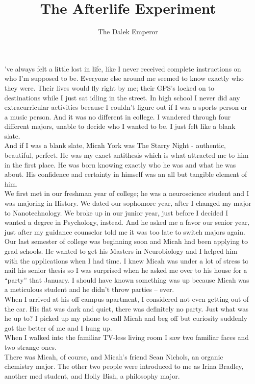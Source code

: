 \documentclass[a5paper]{scrartcl}
\title{The Afterlife Experiment}
\author{The Dalek Emperor}
\begin{document}
\maketitle

've always felt a little lost in life, like I never received complete instructions on who I'm supposed to be. Everyone else around me seemed to know exactly who they were. Their lives would fly right by me; their GPS’s locked on to destinations while I just sat idling in the street. In high school I never did any extracurricular activities because I couldn't figure out if I was a sports person or a music person. And it was no different in college. I wandered through four different majors, unable to decide who I wanted to be. I just felt like a blank slate.\\
And if I was a blank slate, Micah York was The Starry Night - authentic, beautiful, perfect. He was my exact antithesis which is what attracted me to him in the first place. He was born knowing exactly who he was and what he was about. His confidence and certainty in himself was an all but tangible element of him.\\
We first met in our freshman year of college; he was a neuroscience student and I was majoring in History. We dated our sophomore year, after I changed my major to Nanotechnology. We broke up in our junior year, just before I decided I wanted a degree in Psychology, instead. And he asked me a favor our senior year, just after my guidance counselor told me it was too late to switch majors again.\\
Our last semester of college was beginning soon and Micah had been applying to grad schools. He wanted to get his Masters in Neurobiology and I helped him with the applications when I had time. I knew Micah was under a lot of stress to nail his senior thesis so I was surprised when he asked me over to his house for a “party” that January. I should have known something was up because Micah was a meticulous student and he didn’t throw parties – ever.\\
When I arrived at his off campus apartment, I considered not even getting out of the car. His flat was dark and quiet, there was definitely no party. Just what was he up to? I picked up my phone to call Micah and beg off but curiosity suddenly got the better of me and I hung up.\\
When I walked into the familiar TV-less living room I saw two familiar faces and two strange ones.\\
There was Micah, of course, and Micah’s friend Sean Nichols, an organic chemistry major. The other two people were introduced to me as Irina Bradley, another med student, and Holly Bish, a philosophy major.\\
\end{document}
